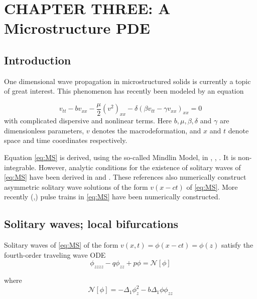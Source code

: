 \chapter{CHAPTER THREE: A Microstructure PDE } \label{chapter_3}

\section{Introduction}

One dimensional wave propagation in microstructured solids is currently a topic of great interest.
This phenomenon has recently been modeled \cite{STE} by an equation

\begin{equation}\label{eq:MS}
v_{tt} - b v_{xx} - \frac{\mu}{2} \left( v^2 \right)_{xx} - \delta \left( \beta v_{tt} - \gamma v_{xx}\right)_{xx} = 0 
\end{equation}
with complicated dispersive and nonlinear terms. Here $b, \mu, \beta, \delta$
and $\gamma$ are dimensionless parameters, $v$ denotes the macrodeformation,
and $x$ and $t$ denote space and time coordinates respectively.

Equation \eqref{eq:MS} is derived, using the so-called Mindlin Model, in
\cite{STE}, \cite{JE1}, \cite{JE2}.  It is non-integrable. However, analytic
conditions for the existence of solitary waves of \eqref{eq:MS} have been
derived in \cite{JE2} and \cite{STE}. These references also numerically
construct asymmetric solitary wave solutions of the form $ v\left(x - c t
\right)$ of \eqref{eq:MS}.  More recently (\cite{EP},\cite{EBS}) pulse trains
in \eqref{eq:MS} have been numerically constructed.

\section{Solitary waves; local bifurcations}


Solitary waves of \eqref{eq:MS} of the form 
$v(x,t) = \phi\left(x - c t\right) = \phi\left(z\right)$
 satisfy the fourth-order traveling wave ODE
\begin{equation} \label{eq:ode2} \phi_{zzzz} - q \phi_{zz} + p \phi = \mathcal{N}[\phi]
\end{equation}

where 
\begin{equation}
\mathcal{N}\left[\phi\right] = -\Delta_1 \phi_z^2 - b \Delta_1 \phi \phi_{zz}
\end{equation}

